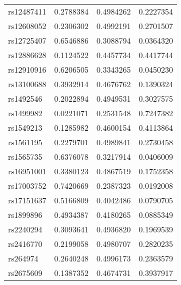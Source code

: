\documentclass[
]{article}
\theoremstyle{plain}
\begin{document}
\begin{table}[H]
\begin{minipage}{0.5\linewidth}
\begin{tabular}{lrrr}
rs12487411 & 0.2788384 & 0.4984262 & 0.2227354\\
rs12608052 & 0.2306302 & 0.4992191 & 0.2701507\\
\addlinespace
rs12725407 & 0.6546886 & 0.3088794 & 0.0364320\\
rs12886628 & 0.1124522 & 0.4457734 & 0.4417744\\
rs12910916 & 0.6206505 & 0.3343265 & 0.0450230\\
rs13100688 & 0.3932914 & 0.4676762 & 0.1390324\\
rs1492546 & 0.2022894 & 0.4949531 & 0.3027575\\
\addlinespace
rs1499982 & 0.0221071 & 0.2531548 & 0.7247382\\
rs1549213 & 0.1285982 & 0.4600154 & 0.4113864\\
rs1561195 & 0.2279701 & 0.4989841 & 0.2730458\\
rs1565735 & 0.6376078 & 0.3217914 & 0.0406009\\
rs16951001 & 0.3380123 & 0.4867519 & 0.1752358\\
\addlinespace
rs17003752 & 0.7420669 & 0.2387323 & 0.0192008\\
rs17151637 & 0.5166809 & 0.4042486 & 0.0790705\\
rs1899896 & 0.4934387 & 0.4180265 & 0.0885349\\
rs2240294 & 0.3093641 & 0.4936820 & 0.1969539\\
rs2416770 & 0.2199058 & 0.4980707 & 0.2820235\\
\addlinespace
rs264974 & 0.2640248 & 0.4996173 & 0.2363579\\
rs2675609 & 0.1387352 & 0.4674731 & 0.3937917\\
\bottomrule
\end{tabular}


  \end{minipage}
  \qquad
  \begin{minipage}{0.5\linewidth}
    \center
    

\end{minipage}
\end{table}
\end{document}

